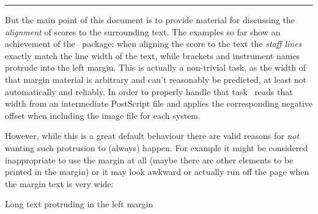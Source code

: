 \documentclass[DIV=12]{scrartcl}
\begin{document}
\bigskip
\hrule

\bigskip

But the main point of this document is to provide material for discussing the \emph{alignment} of scores to the surrounding text. The examples so far show an achievement of the \lyluatex\ package: when aligning the score to the text the \emph{staff lines} exactly match the line width of the text, while brackets and instrument names protrude into the left margin.  This is actually a non-trivial task, as the width of that margin material is arbitrary and can't reasonably be predicted, at least not automatically and reliably.  In order to properly handle that task \lyluatex\ reads that width from an intermediate PostScript file and applies the corresponding negative offset when including the image file for each system.

\bigskip
However, while this is a great default behaviour there are valid reasons for \emph{not} wanting such protrusion to (always) happen.  For example it might be considered inappropriate to use the margin at all (maybe there are other elements to be printed in the margin) or it may look awkward or  actually run off the page when the margin text is very wide:


\begin{musicExampleNonFloat}
\caption{Long text protruding in the left margin}
\end{musicExampleNonFloat}
\end{document}
